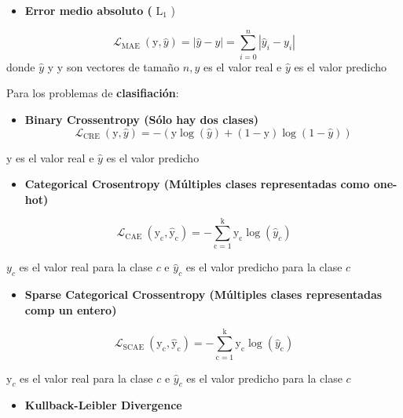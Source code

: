 \documentclass[
  a4paper,
  DIV=11,
  numbers=noendperiod]{scrreprt}
\providecommand{\tightlist}{%
  \setlength{\itemsep}{0pt}\setlength{\parskip}{0pt}}\usepackage{longtable,booktabs,array}
\begin{document}
\begin{itemize}
\tightlist
\item
  \textbf{Error medio absoluto (} \(\mathrm{L}_1\) )
\end{itemize}

\[
\mathcal{L}_{\text {MAE }}(\mathrm{y}, \hat{y})=|\hat{y}-y|=\sum_{i=0}^n\left|\hat{y}_i-y_i\right|
\] donde \(\hat{y}\) y y son vectores de tamaño \(n, y\) es el valor
real e \(\hat{y}\) es el valor predicho

Para los problemas de \textbf{clasifiación}:

\begin{itemize}
\tightlist
\item
  \textbf{Binary Crossentropy (Sólo hay dos clases)} \[
  \mathcal{L}_{\text {CRE }}(\mathrm{y}, \hat{y})=-(\mathrm{y} \log (\hat{y})+(1-\mathrm{y}) \log (1-\hat{y}))
  \]
\end{itemize}

\(\mathrm{y}\) es el valor real e \(\hat{y}\) es el valor predicho

\begin{itemize}
\tightlist
\item
  \textbf{Categorical Crosentropy (Múltiples clases representadas como
  one-hot)}
\end{itemize}

\[
\mathcal{L}_{\text {CAE }}\left(\mathrm{y}_{\mathrm{c}}, \hat{\mathrm{y}}_{\mathrm{c}}\right)=-\sum_{\mathrm{c}=1}^{\mathrm{k}} \mathrm{y}_{\mathrm{c}} \log \left(\hat{y}_c\right)
\]

\(y_c\) es el valor real para la clase \(c\) e \(\hat{y}_c\) es el valor
predicho para la clase \(c\)

\begin{itemize}
\tightlist
\item
  \textbf{Sparse Categorical Crossentropy (Múltiples clases
  representadas comp un entero)}
\end{itemize}

\[
\mathcal{L}_{\text {SCAE }}\left(\mathrm{y}_{\mathrm{c}}, \hat{\mathrm{y}}_{\mathrm{c}}\right)=-\sum_{\mathrm{c}=1}^{\mathrm{k}} \mathrm{y}_{\mathrm{c}} \log \left(\hat{y}_{\mathrm{c}}\right)
\]

\(\mathrm{y}_c\) es el valor real para la clase \(c\) e \(\hat{y}_c\) es
el valor predicho para la clase \(c\)

\begin{itemize}
\tightlist
\item
  \textbf{Kullback-Leibler Divergence}
\end{itemize}
\end{document}
